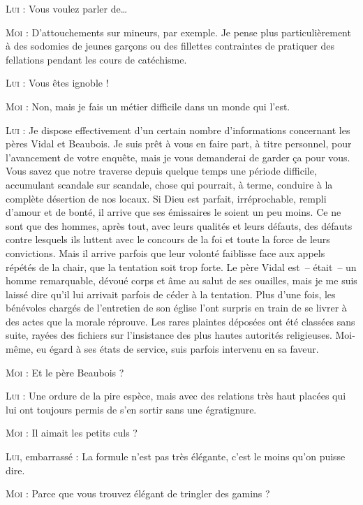 \begin{dialogue}

\textsc{Lui} : Vous voulez parler de…

\textsc{Moi} : D’attouchements sur mineurs, par exemple. Je pense plus particulièrement à des sodomies de jeunes garçons ou des fillettes contraintes de pratiquer des fellations pendant les cours de catéchisme.

\textsc{Lui} : Vous êtes ignoble !

\textsc{Moi} : Non, mais je fais un métier difficile dans un monde qui l’est.

\textsc{Lui} : Je dispose effectivement d’un certain nombre d’informations concernant les pères Vidal et Beaubois. Je suis prêt à vous en faire part, à titre personnel, pour l’avancement de votre enquête, mais je vous demanderai de garder ça pour vous. Vous savez que notre traverse depuis quelque temps une période difficile, accumulant scandale sur scandale, chose qui pourrait, à terme, conduire à la complète désertion de nos locaux. Si Dieu est parfait, irréprochable, rempli d’amour et de bonté, il arrive que ses émissaires le soient un peu moins. Ce ne sont que des hommes, après tout, avec leurs qualités et leurs défauts, des défauts contre lesquels ils luttent avec le concours de la foi et toute la force de leurs convictions. Mais il arrive parfois que leur volonté faiblisse face aux appels répétés de la chair, que la tentation soit trop forte. Le père Vidal est~-- était~-- un homme remarquable, dévoué corps et âme au salut de ses ouailles, mais je me suis laissé dire qu’il lui arrivait parfois de céder à la tentation. Plus d’une fois, les bénévoles chargés de l’entretien de son église l’ont surpris en train de se livrer à des actes que la morale réprouve. Les rares plaintes déposées ont été classées sans suite, rayées des fichiers sur l’insistance des plus hautes autorités religieuses. Moi-même, eu égard à ses états de service, suis parfois intervenu en sa faveur.

\textsc{Moi} : Et le père Beaubois ?

\textsc{Lui} : Une ordure de la pire espèce, mais avec des relations très haut placées qui lui ont toujours permis de s’en sortir sans une égratignure.

\textsc{Moi} : Il aimait les petits culs ?

\textsc{Lui}, embarrassé : La formule n’est pas très élégante, c’est le moins qu’on puisse dire.

\textsc{Moi} : Parce que vous trouvez élégant de tringler des gamins ?


\end{dialogue}

